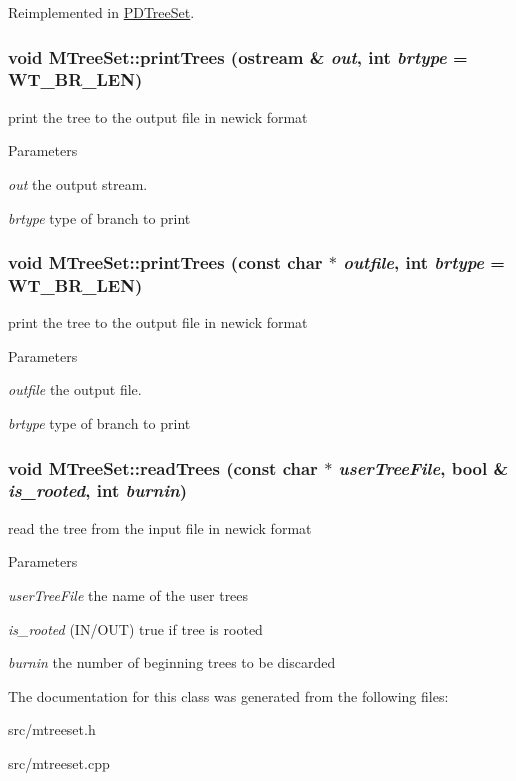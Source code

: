 Reimplemented in \hyperlink{classPDTreeSet_a0af6b254e9faff292db3684ec6089e24}{PDTreeSet}.\hypertarget{classMTreeSet_ad4401d1bde1649b95439953c218ca224}{
\subsubsection[{printTrees}]{\setlength{\rightskip}{0pt plus 5cm}void MTreeSet::printTrees (ostream \& {\em out}, \/  int {\em brtype} = {\ttfamily WT\_\-BR\_\-LEN})}}
\label{classMTreeSet_ad4401d1bde1649b95439953c218ca224}
print the tree to the output file in newick format 
\begin{DoxyParams}{Parameters}
\item[{\em out}]the output stream. \item[{\em brtype}]type of branch to print \end{DoxyParams}
\hypertarget{classMTreeSet_a0fbde69391914ed669cd05007946867d}{
\subsubsection[{printTrees}]{\setlength{\rightskip}{0pt plus 5cm}void MTreeSet::printTrees (const char $\ast$ {\em outfile}, \/  int {\em brtype} = {\ttfamily WT\_\-BR\_\-LEN})}}
\label{classMTreeSet_a0fbde69391914ed669cd05007946867d}
print the tree to the output file in newick format 
\begin{DoxyParams}{Parameters}
\item[{\em outfile}]the output file. \item[{\em brtype}]type of branch to print \end{DoxyParams}
\hypertarget{classMTreeSet_a5522394de84eee1544e021d1baed3655}{
\subsubsection[{readTrees}]{\setlength{\rightskip}{0pt plus 5cm}void MTreeSet::readTrees (const char $\ast$ {\em userTreeFile}, \/  bool \& {\em is\_\-rooted}, \/  int {\em burnin})}}
\label{classMTreeSet_a5522394de84eee1544e021d1baed3655}
read the tree from the input file in newick format 
\begin{DoxyParams}{Parameters}
\item[{\em userTreeFile}]the name of the user trees \item[{\em is\_\-rooted}](IN/OUT) true if tree is rooted \item[{\em burnin}]the number of beginning trees to be discarded \end{DoxyParams}


The documentation for this class was generated from the following files:\begin{DoxyCompactItemize}
\item 
src/mtreeset.h\item 
src/mtreeset.cpp\end{DoxyCompactItemize}
